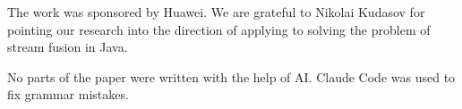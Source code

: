 
The work was sponsored by Huawei.
We are grateful to Nikolai Kudasov for pointing our research into the direction of applying \phic{} to solving the problem of stream fusion in Java.

No parts of the paper were written with the help of AI.
Claude Code was used to fix grammar mistakes.
